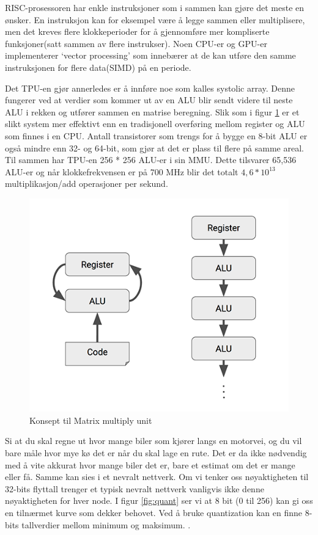 RISC-prosessoren har enkle instruksjoner som i sammen kan gjøre det meste en ønsker. En instruksjon kan for eksempel være å legge sammen eller multiplisere, men det kreves flere klokkeperioder for å gjennomføre mer kompliserte funksjoner(satt sammen av flere instrukser). Noen CPU-er og GPU-er implementerer ‘vector processing’ \cite{look_at_TPU} som innebærer at de kan utføre den samme instruksjonen for flere data(SIMD) på en periode. 

Det TPU-en gjør annerledes er å innføre noe som kalles systolic array. Denne fungerer ved at verdier som kommer ut av en ALU blir sendt videre til neste ALU i rekken og utfører sammen en matrise beregning. Slik som i figur \ref{fig:mxu} er et slikt system mer effektivt enn en tradisjonell overføring mellom register og ALU som finnes i en CPU. Antall transistorer som trengs for å bygge en 8-bit ALU er også mindre enn 32- og 64-bit, som gjør at det er plass til flere på samme areal. Til sammen har TPU-en 256 * 256 ALU-er i sin MMU\cite{look_at_TPU}. Dette tilsvarer 65,536 ALU-er og når klokkefrekvensen er på 700 MHz blir det totalt $4,6 * 10^{13}$ multiplikasjon/add operasjoner per sekund. 

\begin{figure}[hb]
    \centering
    \includegraphics[width=\textwidth]{images/MXU.png}
    \caption{Konsept til Matrix multiply unit}
    \label{fig:mxu}
\end{figure}

Si at du skal regne ut hvor mange biler som kjører langs en motorvei, og du vil bare måle hvor mye kø det er når du skal lage en rute. Det er da ikke nødvendig med å vite akkurat hvor mange biler det er, bare et estimat om det er mange eller få. Samme kan sies i et nevralt nettverk. Om vi tenker oss nøyaktigheten til 32-bits flyttall trenger et typisk nevralt nettverk vanligvis ikke denne nøyaktigheten for hver node. I figur \ref{fig:quant} ser vi at 8 bit (0 til 256) kan gi oss en tilnærmet kurve som dekker behovet. Ved å bruke quantization kan en finne 8-bits tallverdier mellom minimum og maksimum. \cite{look_at_TPU}.
 
